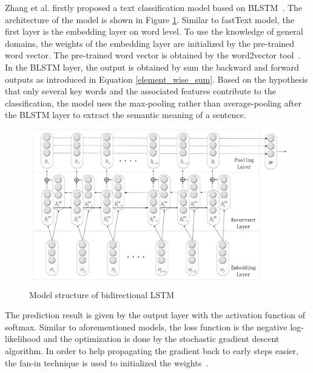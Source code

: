 Zhang et al. firstly proposed a text classification model based on BLSTM~\cite{zhang2015relation}. The architecture of the model is shown in Figure \ref{blstm}. Similar to fastText model, the first layer is the embedding layer on word level. To use the knowledge of general domains, the weights of the embedding layer are initialized by the pre-trained word vector. The pre-trained word vector is obtained by the word2vector tool~\cite{Mikolov2013}. In the BLSTM layer, the output is obtained by sum the backward and forward outputs as introduced in Equation \ref{element_wise_sum}. Based on the hypothesis that only several key words and the associated features contribute to the classification, the model uses the max-pooling rather than average-pooling after the BLSTM layer to extract the semantic meaning of a sentence.
\begin{figure}
\caption{Model structure of bidirectional LSTM}
\label{blstm}
\centering
\includegraphics{blstm.png}
\end{figure}

The prediction result is given by the output layer with the activation function of softmax. Similar to aforementioned models, the loss function is the negative log-likelihood and the optimization is done by the stochastic gradient descent algorithm. In order to help propagating the gradient back to early steps easier, the fan-in technique is used to initialized the weights~\cite{plaut1987learning}. 





